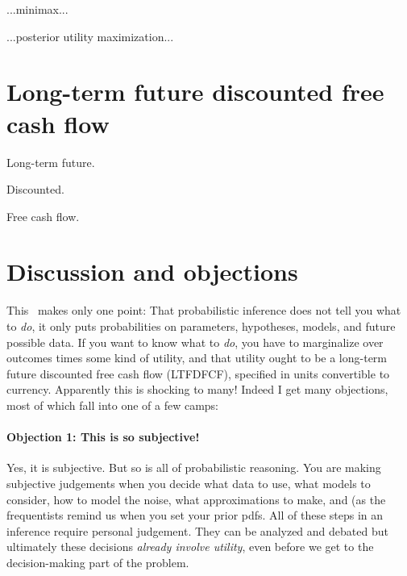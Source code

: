 \documentclass[12pt,twoside,pdftex]{article}
\begin{document}
...minimax...

...posterior utility maximization...

\section{Long-term future discounted free cash flow}

Long-term future.

Discounted.

Free cash flow.

\section{Discussion and objections}

This \documentname\ makes only one point: That probabilistic inference
does not tell you what to \emph{do}, it only puts probabilities on
parameters, hypotheses, models, and future possible data.  If you want
to know what to \emph{do}, you have to marginalize over outcomes times
some kind of utility, and that utility ought to be a long-term future
discounted free cash flow (LTFDFCF), specified in units convertible to
currency.  Apparently this is shocking to many!  Indeed I get many
objections, most of which fall into one of a few camps:

\paragraph{Objection 1: This is so subjective!}
Yes, it is subjective.  But so is all of probabilistic reasoning.  You
are making subjective judgements when you decide what data to use,
what models to consider, how to model the noise, what approximations
to make, and (as the frequentists remind us when you set your prior pdfs.  All of these steps in an
inference require personal judgement.  They can be analyzed and
debated but ultimately these decisions \emph{already involve utility},
even before we get to the decision-making part of the problem.
\end{document}
